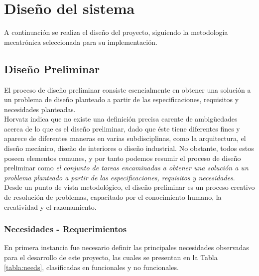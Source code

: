 \chapter{Diseño del sistema}
%
A continuación se realiza el diseño del proyecto, siguiendo la metodología mecatrónica seleccionada para su implementación.

\section{Diseño Preliminar}
El proceso de diseño preliminar consiste esencialmente en obtener una solución a un problema de diseño planteado a partir de las especificaciones, requisitos y necesidades planteadas. \\

Horvatz \cite{DC1} indica que no existe una definición precisa carente de ambigüedades acerca de lo que es el diseño preliminar, dado que éste tiene diferentes fines y aparece de diferentes maneras en varias subdisciplinas, como la arquitectura, el diseño mecánico, diseño de interiores o diseño industrial. No obstante, todos estos poseen elementos comunes, y por tanto podemos resumir el proceso de diseño preliminar como \textit{el conjunto de tareas encaminadas a obtener una solución a un problema planteado a partir de las especificaciones, requisitos y necesidades}. Desde un punto de vista metodológico, el diseño preliminar es un proceso creativo de resolución de problemas, capacitado por el conocimiento humano, la creatividad y el razonamiento.

\subsection{Necesidades - Requerimientos}
En primera instancia fue necesario definir las principales necesidades observadas para el desarrollo de este proyecto, las cuales se presentan en la Tabla \ref{tabla:needs}, clasificadas en funcionales y no funcionales.

